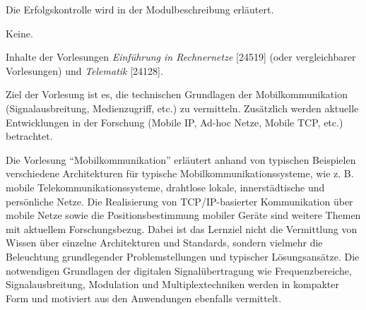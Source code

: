 \begin{course}

\setdoclanguagegerman
{}



\coursehead


\label{cour_5385.dp_997}


\begin{styleenv}
\begin{assessment}
Die Erfolgskontrolle wird in der Modulbeschreibung erläutert.


\end{assessment}

\begin{conditions}Keine.\end{conditions}

\begin{recommendations}Inhalte der Vorlesungen \emph{Einführung in Rechnernetze} [24519] (oder vergleichbarer Vorlesungen) und \emph{Telematik }[24128].

\end{recommendations}
\end{styleenv}

\begin{learningoutcomes}
Ziel der Vorlesung ist es, die technischen Grundlagen der Mobilkommunikation (Signalausbreitung, Medienzugriff, etc.) zu vermitteln. Zusätzlich werden aktuelle Entwicklungen in der Forschung (Mobile IP, Ad-hoc Netze, Mobile TCP, etc.) betrachtet.


\end{learningoutcomes}

\begin{content}
Die Vorlesung “Mobilkommunikation” erläutert anhand von typischen Beispielen verschiedene Architekturen für typische Mobilkommunikationssysteme, wie z. B. mobile Telekommunikationssysteme, drahtlose lokale, innerstädtische und persönliche Netze. Die Realisierung von TCP/IP-basierter Kommunikation über mobile Netze sowie die Positionsbestimmung mobiler Geräte sind weitere Themen mit aktuellem Forschungsbezug. Dabei ist das Lernziel nicht die Vermittlung von Wissen über einzelne Architekturen und Standards, sondern vielmehr die Beleuchtung grundlegender Problemstellungen und typischer Lösungsansätze. Die notwendigen Grundlagen der digitalen Signalübertragung wie Frequenzbereiche, Signalausbreitung, Modulation und Multiplextechniken werden in kompakter Form und motiviert aus den Anwendungen ebenfalls vermittelt.



\end{content}
\end{course}
